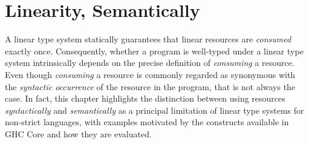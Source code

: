 \documentclass[acmsmall, screen, review]{acmart}
\begin{document}
\section{Linearity, Semantically\label{sec:linearity-semantically}}

A linear type system statically guarantees that linear resources are
\emph{consumed} exactly once. Consequently, whether a program is well-typed
under a linear type system intrinsically depends on the precise definition of
\emph{consuming} a resource. Even though \emph{consuming} a resource is
commonly regarded as synonymous with the \emph{syntactic occurrence} of the resource
in the program, that is not always the case.
%
In fact, this chapter highlights the distinction between using resources
\emph{syntactically} and \emph{semantically} as a principal limitation of
linear type systems for non-strict languages, with examples motivated by the
constructs available in GHC Core and how they are evaluated.

\end{document}
